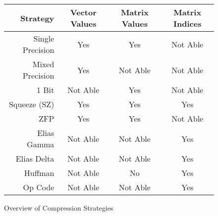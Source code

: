 \begin{figure}
	\centering
	\begin{tabular}{r| c c c}
		Strategy & Vector Values & Matrix Values & Matrix Indices \\
		\hline
		Single Precision & Yes & Yes & Not Able \\
		Mixed Precision & Yes & Not Able & Not Able \\
		1 Bit & Not Able & Yes & Not Able \\
		Squeeze (SZ) & Yes & Yes & Yes \\
		ZFP & Yes & Yes & Not Able \\
		Elias Gamma & Not Able & Not Able & Yes \\
		Elias Delta & Not Able & Not Able & Yes \\
		Huffman & Not Able & No & Yes \\
		Op Code & Not Able & Not Able & Yes
	\end{tabular}
	
	\caption{Overview of Compression Strategies}
	\label{fig:comp-overview}
\end{figure}